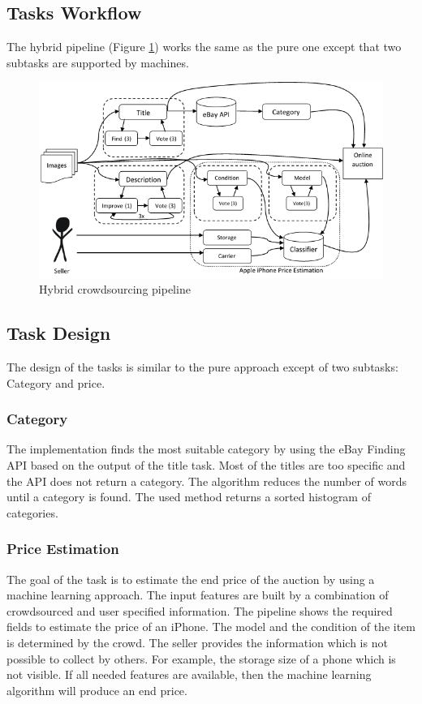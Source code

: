 \subsection{Tasks Workflow}
The hybrid pipeline (Figure \ref{hybridPipeline}) works the same as the pure one except that two subtasks are supported by machines.
\begin{figure}[h!]
\centering
\includegraphics[scale=0.8]{images/pipelines/Hybrid_Pipeline.png}
\caption{Hybrid crowdsourcing pipeline}
\label{hybridPipeline}
\end{figure}
\subsection{Task Design}
The design of the tasks is similar to the pure approach except of two subtasks: Category and price.
\subsubsection{Category}
The implementation finds the most suitable category by using the eBay Finding API based on the output of the title task. Most of the titles are too specific and the API does not return a category. The algorithm reduces the number of words until a category is found. The used method returns a sorted histogram of categories.
\subsubsection{Price Estimation}
The goal of the task is to estimate the end price of the auction by using a machine learning approach. The input features are built by a combination of crowdsourced and user specified information. The pipeline shows the required fields to estimate the price of an iPhone. The model and the condition of the item is determined by the crowd. The seller provides the information which is not possible to collect by others. For example, the storage size of a phone which is not visible. If all needed features are available, then the machine learning algorithm will produce an end price.
